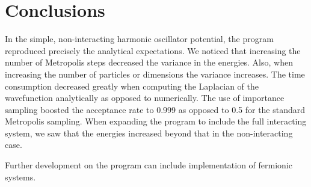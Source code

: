 \documentclass[english, a4paper]{article}
\begin{document}
\section{Conclusions}
In the simple, non-interacting harmonic oscillator potential, the program reproduced precisely the analytical expectations.
We noticed that increasing the number of Metropolis steps decreased the variance in the energies. 
Also, when increasing the number of particles or dimensions the variance increases. 
The time consumption decreased greatly when computing the Laplacian of the wavefunction analytically as opposed to numerically. 
The use of importance sampling boosted the acceptance rate to 0.999 as opposed to 0.5 for the standard Metropolis sampling.
When expanding the program to include the full interacting system, we saw that the energies increased beyond that in the non-interacting case.


Further development on the program can include implementation of fermionic systems.



\end{document}
